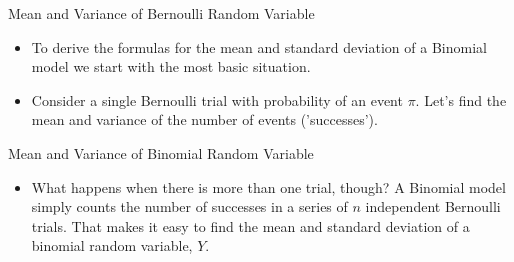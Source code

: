 \documentclass[10pt]{beamer}\usepackage[]{graphicx}\usepackage[]{color}
\begin{document}
\begin{frame}{Mean and Variance of Bernoulli Random Variable}
	\begin{itemize}
		\item To derive the formulas for the mean and standard deviation of a Binomial model we start with
		the most basic situation.
		\item Consider a single Bernoulli trial with probability of an event $\pi$. Let's find the mean and
		variance of the number of events ('successes').
	\end{itemize}
\vspace*{1.5in}
	
\end{frame}


\begin{frame}{Mean and Variance of Binomial Random Variable}
	\begin{itemize}
	\item What happens when there is more than one trial, though? A Binomial model simply counts the
	number of successes in a series of $n$ independent Bernoulli trials. That makes it easy to find the
	mean and standard deviation of a binomial random variable, $Y$.
\end{itemize}
\vspace*{1.5in}
\end{frame}
\end{document}
